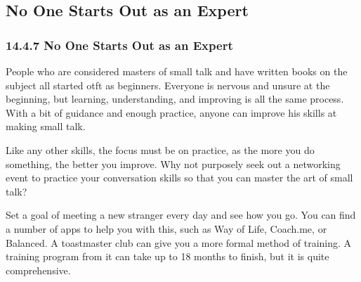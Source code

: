 \documentclass[aspectratio=169,UTF8,c]{beamer}%
\begin{document}
\subsection{No One Starts Out as an Expert}
\begin{frame}
	\frametitle{14.4.7 No One Starts Out as an Expert}
	People who are considered masters of small talk and have written books on the subject all started otft as beginners. Everyone is nervous and unsure at the beginning, but learning, understanding, and improving is all the same process. With a bit of guidance and enough practice, anyone can improve his skills at making small talk.
	
	Like any other skills, the focus must be on practice, as the more you do something, the better you improve. Why not purposely seek out a networking event to practice your conversation skills so that you can master the art of small talk?
	
	Set a goal of meeting a new stranger every day and see how you go. You can find a number of apps to help you with this, such as Way of Life, Coach.me, or Balanced. A toastmaster club can give you a more formal method of training. A training program from it can take up to 18 months to finish, but it is quite comprehensive.
\end{frame}

\makelast
\end{document}

